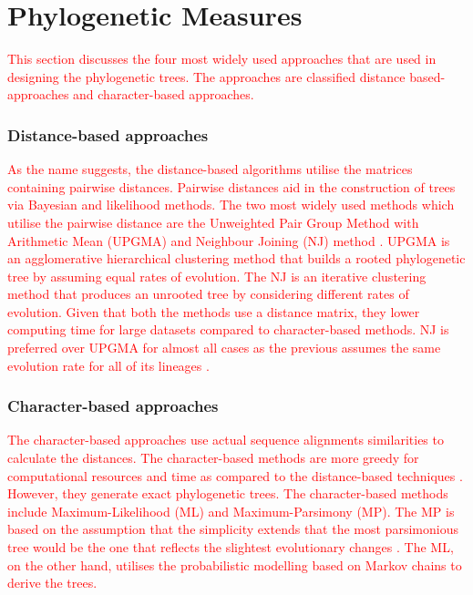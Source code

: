 \chapter{Phylogenetic Measures}
 \setcounter{page}{16}

\textcolor{red}{This section discusses the four most widely used approaches that are used in designing the phylogenetic trees. The approaches are classified distance based-approaches and character-based approaches.}

\subsection{Distance-based approaches}

\textcolor{red}{As the name suggests, the distance-based algorithms utilise the matrices containing pairwise distances. Pairwise distances aid in the construction of trees via Bayesian and likelihood methods. The two most widely used methods which utilise the pairwise distance are the Unweighted Pair Group Method with Arithmetic Mean (UPGMA) and Neighbour Joining (NJ) method \cite{munjal_2019_phylogenetics}. UPGMA is an agglomerative hierarchical clustering method that builds a rooted phylogenetic tree by assuming equal rates of evolution. The NJ is an iterative clustering method that produces an unrooted tree by considering different rates of evolution. Given that both the methods use a distance matrix, they lower computing time for large datasets compared to character-based methods. NJ is preferred over UPGMA for almost all cases as the previous assumes the same evolution rate for all of its lineages \cite{munjal_2019_phylogenetics}.}

\subsection{Character-based approaches}

\textcolor{red}{The character-based approaches use actual sequence alignments similarities to calculate the distances. The character-based methods are more greedy for computational resources and time as compared to the distance-based techniques \cite{munjal_2019_phylogenetics}. However, they generate exact phylogenetic trees. The character-based methods include Maximum-Likelihood (ML) and Maximum-Parsimony (MP). The MP is based on the assumption that the simplicity extends that the most parsimonious tree would be the one that reflects the slightest evolutionary changes \cite{munjal_2019_phylogenetics}. The ML, on the other hand, utilises the probabilistic modelling based on Markov chains to derive the trees.}

